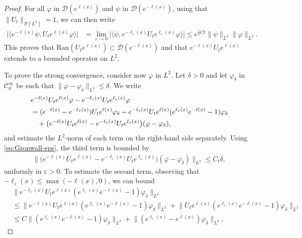 \documentclass[10pt,a4paper]{amsart}
\begin{document}
\begin{proof}
For all $\varphi$ in $\mathcal{D}(e^{\ell(x)})$ and $\psi$ in $\mathcal{D}(e^{-\ell(x)})$, using that $\|U_t\|_{\mathcal{B}(L^2)}=1$, we can then write
	    \begin{align*}
	        \big|\langle e^{-\ell(x)}\psi , U_te^{\ell(x)}\varphi\rangle\big|
	        &=\lim_{\varepsilon\to0}\big|\langle \psi , e^{-\ell_\varepsilon(x)}U_te^{\ell_\varepsilon(x)}\varphi\rangle\big|
	        \le e^{\frac12Ct}\|\psi\|_{L^2}\|\varphi\|_{L^2}.
	   \end{align*}
This proves that $\mathrm{Ran}(U_te^{\ell(x)})\subset\mathcal{D}(e^{-\ell(x)})$ and that $e^{-\ell(x)}U_te^{\ell(x)}$ extends to a bounded operator on $L^2$.

To prove the strong convergence, consider now $\varphi$ in $L^2$. Let $\delta>0$ and let $\varphi_\delta$ in $\mathcal{C}_0^\infty$ be such that $\|\varphi-\varphi_\delta\|_{L^2}\le\delta$. We write
\begin{align}
   & e^{-\ell(x)}U_te^{\ell(x)}\varphi-e^{-\ell_\varepsilon(x)}U_te^{\ell_\varepsilon(x)}\varphi\notag \\
    & = (e^{-\ell(x)}-e^{-\ell_\varepsilon(x)})U_te^{\ell(x)}\varphi_\delta-e^{-\ell_\varepsilon(x)}U_te^{\ell(x)}(e^{\ell_\varepsilon(x)}e^{-\ell(x)}-1)\varphi_\delta\notag \\
    &\quad+ \big(e^{-\ell(x)}U_te^{\ell(x)}-e^{-\ell_\varepsilon(x)}U_te^{\ell_\varepsilon(x)}\big)(\varphi-\varphi_\delta),\label{eq:strongconv1}
\end{align}
and estimate the $L^2$-norm of each term on the right-hand side separately. Using \eqref{eq:Gronwall-eps}, the third term is bounded by
\begin{align}
   \big\| \big(e^{-\ell(x)}U_te^{\ell(x)}-e^{-\ell_\varepsilon(x)}U_te^{\ell_\varepsilon(x)}\big)(\varphi-\varphi_\delta)\big\|_{L^2}\le C_t\delta, \label{eq:strongconv2}
\end{align}
uniformly in $\varepsilon>0$. To estimate the second term, observing that $-\ell_\varepsilon(x)\le\max(-\ell(x),0)$, we can bound
\begin{align*}
   & \big\|e^{-\ell_\varepsilon(x)}U_te^{\ell(x)}(e^{\ell_\varepsilon(x)}e^{-\ell(x)}-1)\varphi_\delta\big\|_{L^2}\\
   &\le\big\|e^{-\ell(x)}U_te^{\ell(x)}(e^{\ell_\varepsilon(x)}e^{-\ell(x)}-1)\varphi_\delta\big\|_{L^2}+\big\|U_te^{\ell(x)}(e^{\ell_\varepsilon(x)}e^{-\ell(x)}-1)\varphi_\delta\big\|_{L^2}\\
   &\le C\big\|(e^{\ell_\varepsilon(x)}e^{-\ell(x)}-1)\varphi_\delta\big\|_{L^2}+\big\|(e^{\ell_\varepsilon(x)}-e^{\ell(x)})\varphi_\delta\big\|_{L^2},

\end{align*}
\end{proof}
\end{document}
